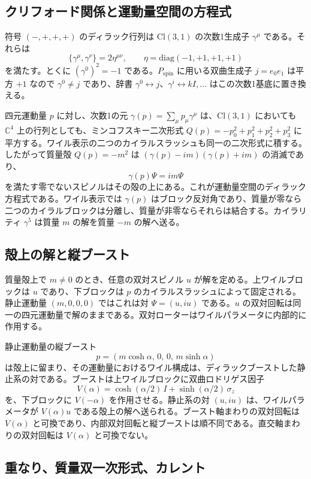 \documentclass[a4paper]{article}
\begin{document}
\subsection{クリフォード関係と運動量空間の方程式}

符号 $(-,+,+,+)$ のディラック行列は $\mathrm{Cl}(3,1)$ の次数1生成子 $\gamma^\mu$ である。それらは
\[
\{\gamma^\mu,\gamma^\nu\}=2\eta^{\mu\nu},\qquad
\eta=\mathrm{diag}(-1,+1,+1,+1)
\]
を満たす。とくに $(\gamma^0)^2=-1$ である。$P_{\mathrm{spin}}$ に用いる双曲生成子 $j=e_0 e_1$ は平方 $+1$ なので $\gamma^0\neq j$ であり、辞書 $\gamma^0\leftrightarrow j$、$\gamma^i\leftrightarrow kI,\ldots$ はこの次数1基底に置き換える。

四元運動量 $p$ に対し、次数1の元 $\gamma(p)=\sum_\mu p_\mu\gamma^\mu$ は、$\mathrm{Cl}(3,1)$ においても $\mathbb{C}^4$ 上の行列としても、ミンコフスキー二次形式 $Q(p)=-p_0^2+p_1^2+p_2^2+p_3^2$ に平方する。ワイル表示の二つのカイラルスラッシュも同一の二次形式に積する。したがって質量殻 $Q(p)=-m^2$ は $(\gamma(p)-im)(\gamma(p)+im)$ の消滅であり、
\[
\gamma(p)\Psi=im\Psi
\]
を満たす零でないスピノルはその殻の上にある。これが運動量空間のディラック方程式である。ワイル表示では $\gamma(p)$ はブロック反対角であり、質量が零なら二つのカイラルブロックは分離し、質量が非零ならそれらは結合する。カイラリティ $\gamma^5$ は質量 $m$ の解を質量 $-m$ の解へ送る。

\subsection{殻上の解と縦ブースト}

質量殻上で $m\neq 0$ のとき、任意の双対スピノル $u$ が解を定める。上ワイルブロックは $u$ であり、下ブロックは $p$ のカイラルスラッシュによって固定される。静止運動量 $(m,0,0,0)$ ではこれは対 $\Psi=(u,iu)$ である。$u$ の双対回転は同一の四元運動量で解のままである。双対ローターはワイルパラメータに内部的に作用する。

静止運動量の縦ブースト
\[
p=(m\cosh\alpha,\,0,\,0,\,m\sinh\alpha)
\]
は殻上に留まり、その運動量におけるワイル構成は、ディラックブーストした静止系の対である。ブーストは上ワイルブロックに双曲ロドリゲス因子
\[
V(\alpha)=\cosh(\alpha/2)\,I+\sinh(\alpha/2)\,\sigma_z
\]
を、下ブロックに $V(-\alpha)$ を作用させる。静止系の対 $(u,iu)$ は、ワイルパラメータが $V(\alpha)u$ である殻上の解へ送られる。ブースト軸まわりの双対回転は $V(\alpha)$ と可換であり、内部双対回転と縦ブーストは順不同である。直交軸まわりの双対回転は $V(\alpha)$ と可換でない。

\subsection{重なり、質量双一次形式、カレント}
\end{document}
